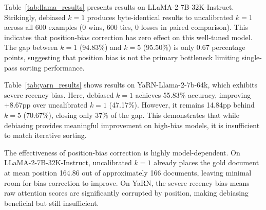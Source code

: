 \begin{table}[t]
\centering
\caption{Results on SynthWiki@28K with YaRN-Llama-2-7b-64k. Debiased $k=1$ improves +8.67pp over uncalibrated $k=1$ but remains 14.84pp behind $k=5$, closing only 37\% of the gap. Best in \textbf{bold}, second-best \underline{underlined}.}
\label{tab:yarn_results}
\end{table}

Table~\ref{tab:llama_results} presents results on LLaMA-2-7B-32K-Instruct. Strikingly, debiased $k=1$ produces byte-identical results to uncalibrated $k=1$ across all 600 examples (0 wins, 600 ties, 0 losses in paired comparison). This indicates that position-bias correction has zero effect on this well-tuned model. The gap between $k=1$ (94.83\%) and $k=5$ (95.50\%) is only 0.67 percentage points, suggesting that position bias is not the primary bottleneck limiting single-pass sorting performance.

Table~\ref{tab:yarn_results} shows results on YaRN-Llama-2-7b-64k, which exhibits severe recency bias. Here, debiased $k=1$ achieves 55.83\% accuracy, improving +8.67pp over uncalibrated $k=1$ (47.17\%). However, it remains 14.84pp behind $k=5$ (70.67\%), closing only 37\% of the gap. This demonstrates that while debiasing provides meaningful improvement on high-bias models, it is insufficient to match iterative sorting.

The effectiveness of position-bias correction is highly model-dependent. On LLaMA-2-7B-32K-Instruct, uncalibrated $k=1$ already places the gold document at mean position 164.86 out of approximately 166 documents, leaving minimal room for bias correction to improve. On YaRN, the severe recency bias means raw attention scores are significantly corrupted by position, making debiasing beneficial but still insufficient.

